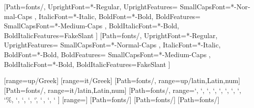 
\usepackage{amsmath}
\usepackage{mathtools}

\usepackage[quiet]{fontspec}
\usepackage{unicode-math}
\setmainfont{Meta}[Path={fonts/},
	UprightFont=*-Regular,
	UprightFeatures={
		SmallCapsFont={*-Normal-Caps}
	},
	ItalicFont=*-Italic,
	BoldFont=*-Bold,
	BoldFeatures={
		SmallCapsFont={*-Medium-Caps}
	},
	BoldItalicFont=*-Bold,
	BoldItalicFeatures={FakeSlant}
]
\setsansfont{Meta}[Path={fonts/},
	UprightFont=*-Regular,
	UprightFeatures={
		SmallCapsFont={*-Normal-Caps}
	},
	ItalicFont=*-Italic,
	BoldFont=*-Bold,
	BoldFeatures={
		SmallCapsFont={*-Medium-Caps}
	},
	BoldItalicFont=*-Bold,
	BoldItalicFeatures={FakeSlant}
]

[range=up/{Greek}]
[range=it/{Greek}]
[Path={fonts/}, range=up/{latin,Latin,num}]
[Path={fonts/}, range=it/{latin,Latin,num}]
[Path={fonts/},
	range={`\+, `\-, `\×, `\÷, `\⋅, `\*, `\/, `\±, `\%, `\‰, `\!, `\?,
		`\., `\,, `\:, `\;}
]
[range=\int]
\setmathfontface{}[Path={fonts/}]
\setmathfontface{}[Path={fonts/}]
\setmathfontface{}[Path={fonts/}]

\usepackage{polyglossia}
\setmainlanguage{german}

\usepackage[pantone312]{wwustyle}
\usepackage{microtype}
\usepackage{selnolig}
\usepackage{csquotes}

\usepackage{graphicx}
\usepackage{gincltex}
\usepackage{grffile}
\usepackage[useregional]{datetime2}
\usepackage{multirow}
\usepackage{siunitx}

\renewcommand{\arraystretch}{1.3}
\hypersetup{unicode}

